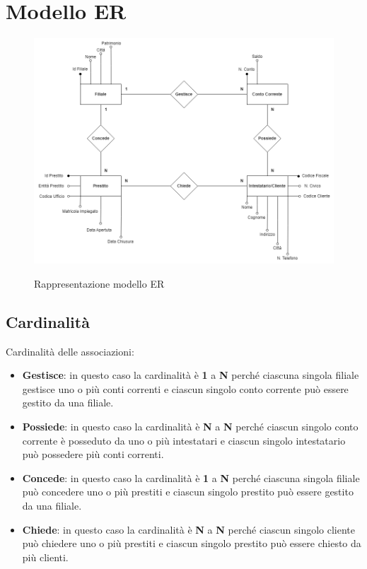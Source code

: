 \documentclass[12pt]{article}
\begin{document}
\section{Modello ER}
\begin{figure}[h!]
    \centering
    \includegraphics[width=16cm]{modello_er_banca.png}
    \label{fig:modello er}
    \caption{Rappresentazione modello ER}
\end{figure}


\subsection{Cardinalità}

\noindent
Cardinalità delle associazioni:

\begin{itemize}
    \item \textbf{Gestisce}: in questo caso la cardinalità è \textbf{1} a \textbf{N} perché ciascuna singola filiale gestisce uno o più conti correnti e ciascun singolo conto corrente può essere gestito da una filiale.
    
    \item \textbf{Possiede}: in questo caso la cardinalità è \textbf{N} a \textbf{N} perché ciascun singolo conto corrente è posseduto da uno o più intestatari e ciascun singolo intestatario può possedere più conti correnti.
    
    \item \textbf{Concede}: in questo caso la cardinalità è \textbf{1} a \textbf{N} perché ciascuna singola filiale può concedere uno o più prestiti e ciascun singolo prestito può essere gestito da una filiale.
    
    \item \textbf{Chiede}: in questo caso la cardinalità è \textbf{N} a \textbf{N} perché ciascun singolo cliente può chiedere uno o più prestiti e ciascun singolo prestito può essere chiesto da più clienti.
\end{itemize}
\end{document}
